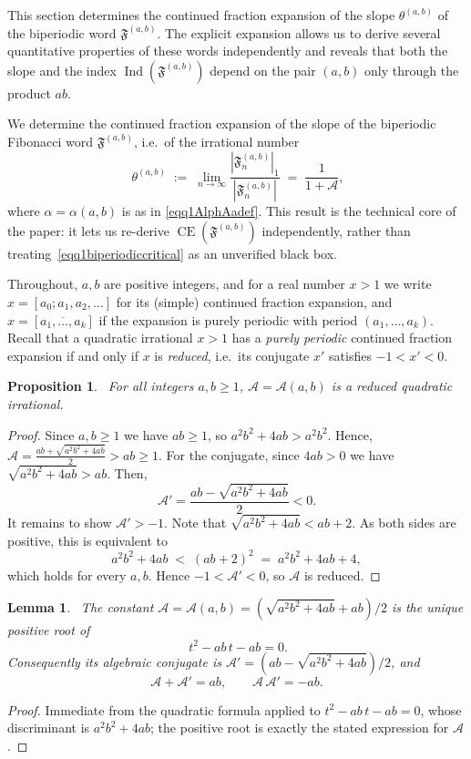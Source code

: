 \documentclass[12pt]{amsart}
\theoremstyle{plain}
\newtheorem{lemma}[theorem]{Lemma}
\newtheorem{proposition}[theorem]{Proposition}
\theoremstyle{definition}
\theoremstyle{remark}
\newcommand{\AlphA}{\mathcal{A}}
\newcommand{\FD}{\mathfrak{F}}
\begin{document}
This section determines the continued fraction expansion of the slope $\theta^{(a,b)}$ of the biperiodic word $\FD^{(a,b)}$. The explicit expansion allows us to derive several quantitative properties of these words independently and reveals that both the slope and the index $\operatorname{Ind}(\FD^{(a,b)})$ depend on the pair $(a,b)$ only through the product $ab$.

We determine the continued fraction expansion of the
slope of the biperiodic Fibonacci word $\FD^{(a,b)}$, i.e.\ of the
irrational number
\begin{equation}~\label{eqq01slopedef}
  \theta^{(a,b)}\;:=\; \lim_{n\to\infty}\frac{|\FD^{(a,b)}_n|_1}{|\FD^{(a,b)}_n|}
  \;=\; \frac{1}{1+\AlphA },
\end{equation}
where $\alpha=\alpha(a,b)$ is as in \eqref{eqq1AlphAadef}. This
result is the technical core of the paper: it lets us re-derive
$\operatorname{CE}(\FD^{(a,b)})$ independently,
rather than treating~\eqref{eqq1biperiodiccritical} as an unverified
black box.

Throughout, $a,b$ are positive integers, and for a real number
$x>1$ we write $x=[a_0;a_1,a_2,\dots]$ for its (simple) continued
fraction expansion, and $x=[\overline{a_1,\dots,a_k}]$ if the
expansion is purely periodic with period $(a_1,\dots,a_k)$. 
Recall that a quadratic irrational $x>1$ has a \emph{purely periodic}
continued fraction expansion if and only if $x$ is \emph{reduced},
i.e.\ its conjugate $x'$ satisfies $-1<x'<0$.

\begin{proposition}~\label{prop01alphareduced}
For all integers $a,b\geqslant 1$, $\AlphA =\AlphA (a,b)$ is a reduced
quadratic irrational.
\end{proposition}
\begin{proof}
Since $a,b\geqslant 1$ we have $ab\geqslant 1$, so $a^2b^2+4ab>a^2b^2$. Hence, 
$\AlphA =\tfrac{ab+\sqrt{a^2b^2+4ab}}{2} > ab \geqslant 1$. For the conjugate, since $4ab>0$ we have
$\sqrt{a^2b^2+4ab}>ab$. Then, 
\[
  \AlphA' = \frac{ab-\sqrt{a^2b^2+4ab}}{2} < 0 .
\]
It remains to show $\AlphA'>-1$. Note that 
$\sqrt{a^2b^2+4ab} < ab+2$. As both sides are positive, this is
equivalent to
\[
  a^2b^2+4ab \;<\; (ab+2)^2 \;=\; a^2b^2+4ab+4,
\]
which holds for every $a,b$. Hence $-1<\AlphA '<0$, so $\AlphA $ is
reduced.
\end{proof}

\begin{lemma}~\label{lem01alphaquadratic}
The constant $\AlphA =\AlphA (a,b)=(\sqrt{a^2b^2+4ab}+ab)/2$ is
the unique positive root of
\begin{equation}~\label{eqq01alphaminpoly}
  t^2 - ab\,t - ab = 0.
\end{equation}
Consequently its algebraic conjugate is
$\AlphA ' = (ab-\sqrt{a^2b^2+4ab})/2$, and
\[
  \AlphA +\AlphA ' = ab, \qquad \AlphA \,\AlphA ' = -ab.
\]
\end{lemma}
\begin{proof}
Immediate from the quadratic formula applied to
$t^2-ab\,t-ab=0$, whose discriminant is $a^2b^2+4ab$; the positive
root is exactly the stated expression for $\AlphA $.
\end{proof}
\end{document}
